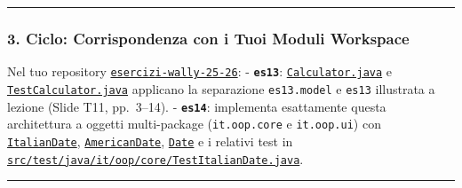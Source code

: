 \documentclass[11pt,a4paper]{article}
\newcommand{\passthrough}[1]{#1}
\begin{document}
\begin{center}\rule{0.5\linewidth}{0.5pt}\end{center}

\subsubsection{3. Ciclo: Corrispondenza con i Tuoi Moduli
Workspace}\label{ciclo-corrispondenza-con-i-tuoi-moduli-workspace}

Nel tuo repository
\href{file:///home/wally/Documenti/GitHub/Programmazione-II/25-26/esercizi-wally-25-26}{\passthrough{\lstinline!esercizi-wally-25-26!}}:
- \textbf{\passthrough{\lstinline!es13!}}:
\href{file:///home/wally/Documenti/GitHub/Programmazione-II/25-26/esercizi-wally-25-26/es13/src/main/java/es13/model/Calculator.java}{\passthrough{\lstinline!Calculator.java!}}
e
\href{file:///home/wally/Documenti/GitHub/Programmazione-II/25-26/esercizi-wally-25-26/es13/src/test/java/es13/TestCalculator.java}{\passthrough{\lstinline!TestCalculator.java!}}
applicano la separazione \passthrough{\lstinline!es13.model!} e
\passthrough{\lstinline!es13!} illustrata a lezione (Slide T11,
pp.~3--14). - \textbf{\passthrough{\lstinline!es14!}}: implementa
esattamente questa architettura a oggetti multi-package
(\passthrough{\lstinline!it.oop.core!} e
\passthrough{\lstinline!it.oop.ui!}) con
\href{file:///home/wally/Documenti/GitHub/Programmazione-II/25-26/esercizi-wally-25-26/es14/src/main/java/it/oop/core/ItalianDate.java}{\passthrough{\lstinline!ItalianDate!}},
\href{file:///home/wally/Documenti/GitHub/Programmazione-II/25-26/esercizi-wally-25-26/es14/src/main/java/it/oop/core/AmericanDate.java}{\passthrough{\lstinline!AmericanDate!}},
\href{file:///home/wally/Documenti/GitHub/Programmazione-II/25-26/esercizi-wally-25-26/es14/src/main/java/it/oop/core/Date.java}{\passthrough{\lstinline!Date!}}
e i relativi test in
\href{file:///home/wally/Documenti/GitHub/Programmazione-II/25-26/esercizi-wally-25-26/es14/src/test/java/it/oop/core/TestItalianDate.java}{\passthrough{\lstinline!src/test/java/it/oop/core/TestItalianDate.java!}}.

\begin{center}\rule{0.5\linewidth}{0.5pt}\end{center}
\end{document}
